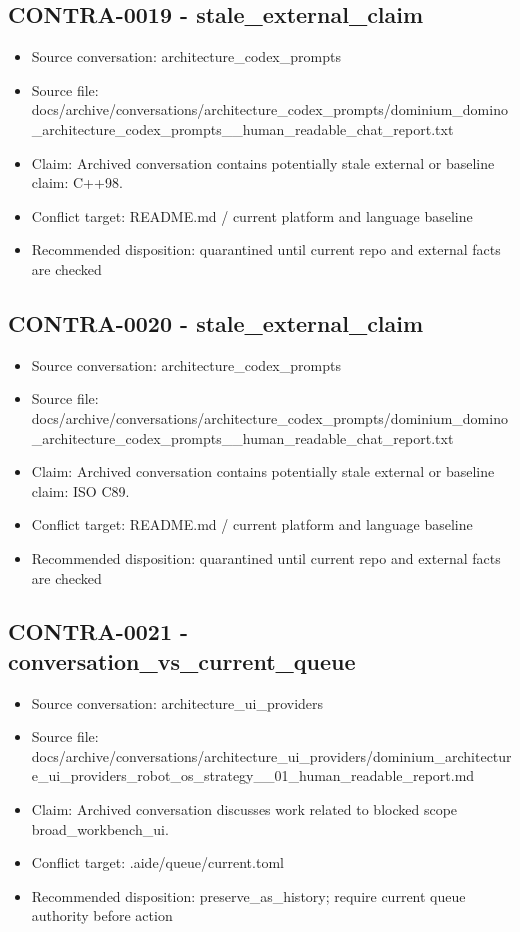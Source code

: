 \documentclass[11pt,a4paper]{report}
\begin{document}
\subsection{CONTRA-0019 - stale\_external\_claim}

\begin{itemize}
\item Source conversation: architecture\_codex\_prompts
\item Source file: docs/archive/conversations/architecture\_codex\_prompts/dominium\_domino\_architecture\_codex\_prompts\_\_human\_readable\_chat\_report.txt
\item Claim: Archived conversation contains potentially stale external or baseline claim: C++98.
\item Conflict target: README.md / current platform and language baseline
\item Recommended disposition: quarantined until current repo and external facts are checked
\end{itemize}

\subsection{CONTRA-0020 - stale\_external\_claim}

\begin{itemize}
\item Source conversation: architecture\_codex\_prompts
\item Source file: docs/archive/conversations/architecture\_codex\_prompts/dominium\_domino\_architecture\_codex\_prompts\_\_human\_readable\_chat\_report.txt
\item Claim: Archived conversation contains potentially stale external or baseline claim: ISO C89.
\item Conflict target: README.md / current platform and language baseline
\item Recommended disposition: quarantined until current repo and external facts are checked
\end{itemize}

\subsection{CONTRA-0021 - conversation\_vs\_current\_queue}

\begin{itemize}
\item Source conversation: architecture\_ui\_providers
\item Source file: docs/archive/conversations/architecture\_ui\_providers/dominium\_architecture\_ui\_providers\_robot\_os\_strategy\_\_01\_human\_readable\_report.md
\item Claim: Archived conversation discusses work related to blocked scope broad\_workbench\_ui.
\item Conflict target: .aide/queue/current.toml
\item Recommended disposition: preserve\_as\_history; require current queue authority before action
\end{itemize}
\end{document}
